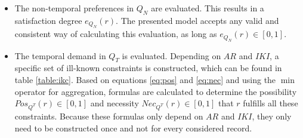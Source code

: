 \vspace{-5pt}
\begin{itemize}
	\item The non-temporal preferences in $Q_{N}$ are evaluated. This results in a satisfaction degree $e_{Q_{N}}(r)$. The presented model accepts any valid and consistent way of calculating this evaluation, as long as $e_{Q_{N}}(r) \in \left[0,1\right]$.
	\item The temporal demand in $Q_{T}$ is evaluated. Depending on $AR$ and $IKI$, a specific set of ill-known constraints is constructed, which can be found in table \ref{table:ikc}. Based on equations \eqref{eq:pos} and \eqref{eq:nec} and using the $\min$ operator for aggregation, formulas are calculated to determine the possibility $Pos_{Q^{T}}(r) \in \left[0,1\right]$ and necessity $Nec_{Q^{T}}(r) \in \left[0,1\right]$ that $r$ fulfills all these constraints. Because these formulas only depend on $AR$ and $IKI$, they only need to be constructed once and not for every considered record.
\end{itemize}

